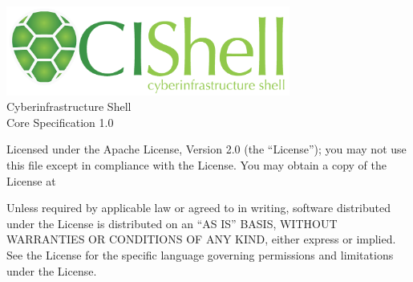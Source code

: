 %

\begin{titlepage}
\begin{center}

\vspace*{1in}

\includegraphics[width=0.7\textwidth]{../img/cishellLogo.png}\\
{\LARGE Cyberinfrastructure Shell}\\
{\Large Core Specification 1.0}\\

\vspace*{\fill}

\begin{minipage}{0.7\textwidth}
\begin{small}
{\color{Gray}


\begin{flushleft}
Licensed under the Apache License, Version 2.0 (the ``License''); you may not use
this file except in compliance with the License. You may obtain a copy of the
License at
\end{flushleft}


\begin{flushleft}
Unless required by applicable law or agreed to in writing, software distributed
under the License is distributed on an ``AS IS'' BASIS, WITHOUT WARRANTIES OR
CONDITIONS OF ANY KIND, either express or implied. See the License for the
specific language governing permissions and limitations under the License.
\end{flushleft}

}
\end{small}
\end{minipage}

\end{center}
\end{titlepage}
